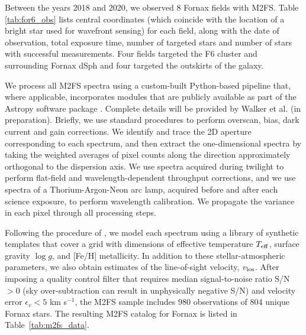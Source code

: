 \documentclass[twocolumn]{aastex63}
\begin{document}

 
Between the years 2018 and 2020, we observed 8 Fornax fields with M2FS.  Table \ref{tab:for6_obs} lists central coordinates (which coincide with the location of a bright star used for wavefront sensing) for each field, along with the date of observation, total exposure time, number of targeted stars and number of stars with successful measurements.  
Four fields targeted the  F6 cluster and surrounding Fornax dSph and four targeted the outskirts of the galaxy.

We process all M2FS spectra using a custom-built  Python-based pipeline that, where applicable, incorporates modules that are publicly available as part of the  Astropy software package \citep{Astropy2013A&A...558A..33A, Astropy2018AJ....156..123A}.  Complete details will be provided by Walker et al. (in preparation).  Briefly, we use standard procedures to perform overscan, bias, dark current and gain corrections.  We identify and trace the 2D aperture corresponding to each spectrum, and then extract the  one-dimensional spectra by taking the weighted averages of pixel counts along the direction approximately orthogonal to the dispersion axis.  We use spectra acquired during twilight to perform flat-field and wavelength-dependent throughput corrections, and we use spectra of a Thorium-Argon-Neon arc lamp, acquired before and after each science exposure, to perform wavelength calibration.  We propagate the variance in each pixel through all processing steps.  

Following the procedure of \citet{Walker2015MNRAS.448.2717W,Walker2015ApJ...808..108W,
Walker2016ApJ...819...53W}, we model each spectrum using a library of synthetic templates that cover a grid with dimensions of effective temperature $T_{\rm eff}$, surface gravity $\log g$, and [Fe/H] metallicity.  In addition to these stellar-atmospheric parameters, we also obtain estimates of the line-of-sight velocity, $v_{\rm los}$.  After imposing a quality control filter that requires  median signal-to-noise ratio S/N$>0$ (sky over-subtraction can result in unphysically negative S/N) and velocity error $\epsilon_v<5$ km s$^{-1}$, the M2FS sample includes 980 observations of 804 unique Fornax stars.   
The resulting M2FS catalog for Fornax is listed in Table~\ref{tab:m2fs_data}.
\end{document}
